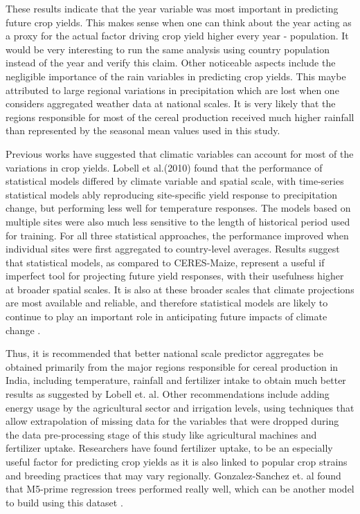 \documentclass[conference]{IEEEtran}
\begin{document}
These results indicate that the year variable was most important in predicting future crop yields. This makes sense when one can think about the year acting as a proxy for the actual factor driving crop yield higher every year - population. It would be very interesting to run the same analysis using country population instead of the year and verify this claim. Other noticeable aspects include the negligible importance of the rain variables in predicting crop yields. This maybe attributed to large regional variations in precipitation which are lost when one considers aggregated weather data at national scales. It is very likely that the regions responsible for most of the cereal production received much higher rainfall than represented by the seasonal mean values used in this study. 

Previous works have suggested that climatic variables can account for most of the variations in crop yields. Lobell et al.(2010) found that the performance of statistical models differed by climate variable and spatial scale, with time-series statistical models ably reproducing site-specific yield response to precipitation change, but performing less well for temperature responses. The models based on multiple sites were also much less sensitive to the length of historical period used for training. For all three statistical approaches, the performance improved when individual sites were first aggregated to country-level averages. Results suggest that statistical models, as compared to CERES-Maize, represent a useful if imperfect tool for projecting future yield responses, with their usefulness higher at broader spatial scales. It is also at these broader scales that climate projections are most available and reliable, and therefore statistical models are likely to continue to play an important role in anticipating future impacts of climate change \cite{Lobell2010}.

Thus, it is recommended that better national scale predictor aggregates be obtained primarily from the major regions responsible for cereal production in India, including temperature, rainfall and fertilizer intake to obtain much better results as suggested by Lobell et. al. Other recommendations include adding energy usage by the agricultural sector and irrigation levels, using techniques that allow extrapolation of missing data for the variables that were dropped during the data pre-processing stage of this study like agricultural machines and fertilizer uptake. Researchers have found fertilizer uptake, to be an especially useful factor for predicting crop yields as it is also linked to popular crop strains and breeding practices that may vary regionally. Gonzalez-Sanchez et. al found that M5-prime regression trees performed really well, which can be another model to build using this dataset \cite{Gonzalez-Sanchez2014}.
\end{document}
